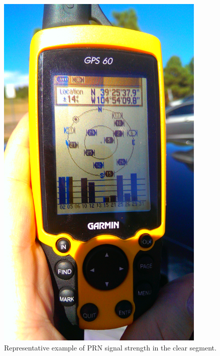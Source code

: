 \documentclass[]{aiaa-tc}%
\begin{document}
	\begin{figure}[H]
		\centering
		\includegraphics[width = 10cm]{GoodSignalStrength.jpg}
		\caption{Representative example of PRN signal strength in the clear segment.}
		\label{fig:GoodSignalStrength}
	\end{figure}
		
\end{document}
